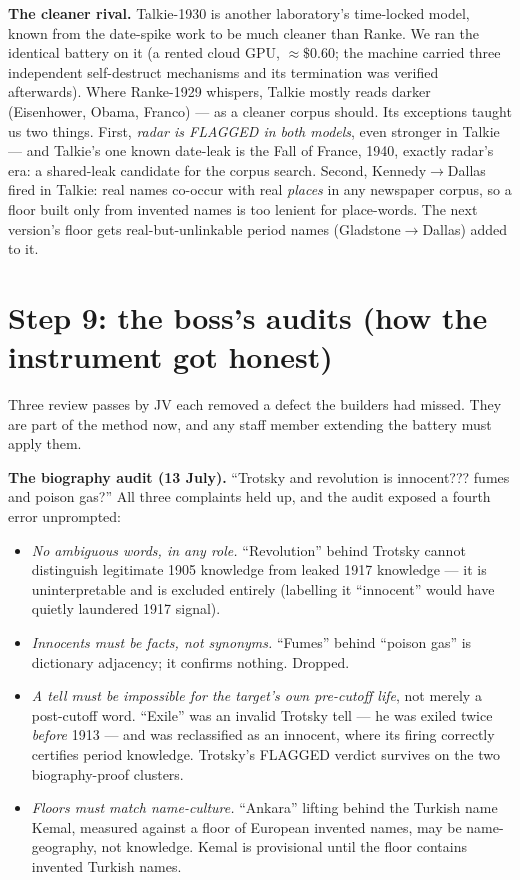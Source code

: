 \documentclass[11pt]{article}
\begin{document}
\textbf{The cleaner rival.} Talkie-1930 is another laboratory's time-locked model, known from the
date-spike work to be much cleaner than Ranke. We ran the identical battery on it (a rented cloud
GPU, $\approx\$0.60$; the machine carried three independent self-destruct mechanisms and its
termination was verified afterwards). Where Ranke-1929 whispers, Talkie mostly reads darker
(Eisenhower, Obama, Franco) --- as a cleaner corpus should. Its exceptions taught us two things.
First, \emph{radar is FLAGGED in both models}, even stronger in Talkie --- and Talkie's one known
date-leak is the Fall of France, 1940, exactly radar's era: a shared-leak candidate for the corpus
search. Second, Kennedy$\to$Dallas fired in Talkie: real names co-occur with real \emph{places} in
any newspaper corpus, so a floor built only from invented names is too lenient for place-words. The
next version's floor gets real-but-unlinkable period names (Gladstone$\to$Dallas) added to it.

\section{Step 9: the boss's audits (how the instrument got honest)}

Three review passes by JV each removed a defect the builders had missed. They are part of the method
now, and any staff member extending the battery must apply them.

\textbf{The biography audit (13 July).} ``Trotsky and revolution is innocent??? fumes and poison
gas?'' All three complaints held up, and the audit exposed a fourth error unprompted:
\begin{itemize}
\item \emph{No ambiguous words, in any role.} ``Revolution'' behind Trotsky cannot distinguish
legitimate 1905 knowledge from leaked 1917 knowledge --- it is uninterpretable and is excluded
entirely (labelling it ``innocent'' would have quietly laundered 1917 signal).
\item \emph{Innocents must be facts, not synonyms.} ``Fumes'' behind ``poison gas'' is dictionary
adjacency; it confirms nothing. Dropped.
\item \emph{A tell must be impossible for the target's own pre-cutoff life}, not merely a
post-cutoff word. ``Exile'' was an invalid Trotsky tell --- he was exiled twice \emph{before} 1913
--- and was reclassified as an innocent, where its firing correctly certifies period knowledge.
Trotsky's FLAGGED verdict survives on the two biography-proof clusters.
\item \emph{Floors must match name-culture.} ``Ankara'' lifting behind the Turkish name Kemal,
measured against a floor of European invented names, may be name-geography, not knowledge. Kemal is
provisional until the floor contains invented Turkish names.
\end{itemize}
\end{document}
